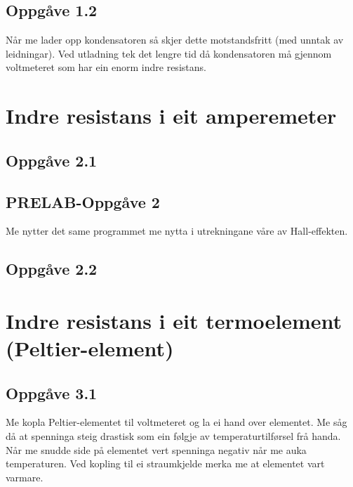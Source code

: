 \documentclass[11pt, a4paper]{article}
\begin{document}
  \subsection*{Oppgåve 1.2}
    Når me lader opp kondensatoren så skjer dette motstandsfritt (med unntak av leidningar). Ved utladning tek det lengre tid då kondensatoren må gjennom voltmeteret som har ein 
    enorm indre resistans.




\newpage


\section*{Indre resistans i eit amperemeter}


  \subsection*{Oppgåve 2.1}


  \subsection*{PRELAB-Oppgåve 2}
    Me nytter det same programmet me nytta i utrekningane våre av Hall-effekten.
    

  
  \subsection*{Oppgåve 2.2}
    


\newpage


\section*{Indre resistans i eit termoelement (Peltier-element)}


  \subsection*{Oppgåve 3.1}
    Me kopla Peltier-elementet til voltmeteret og la ei hand over elementet. Me såg då at spenninga steig drastisk som ein følgje av temperaturtilførsel frå handa. Når me snudde 
    side på elementet vert spenninga negativ når me auka temperaturen. Ved kopling til ei straumkjelde merka me at elementet vart varmare.
\end{document}
